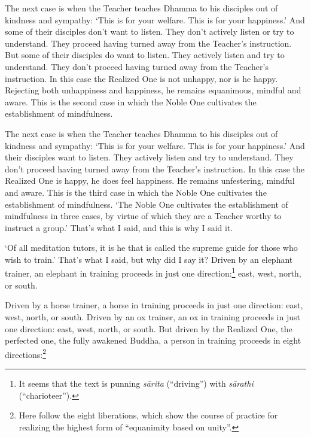 \documentclass[12pt,openany]{book}%
\begin{document}
The next case is when the Teacher teaches Dhamma to his disciples out of kindness and sympathy: ‘This is for your welfare. This is for your happiness.’ And some of their disciples don’t want to listen. They don’t actively listen or try to understand. They proceed having turned away from the Teacher’s instruction. But some of their disciples do want to listen. They actively listen and try to understand. They don’t proceed having turned away from the Teacher’s instruction. In this case the Realized One is not unhappy, nor is he happy. Rejecting both unhappiness and happiness, he remains equanimous, mindful and aware. This is the second case in which the Noble One cultivates the establishment of mindfulness. 

The next case is when the Teacher teaches Dhamma to his disciples out of kindness and sympathy: ‘This is for your welfare. This is for your happiness.’ And their disciples want to listen. They actively listen and try to understand. They don’t proceed having turned away from the Teacher’s instruction. In this case the Realized One is happy, he does feel happiness. He remains unfestering, mindful and aware. This is the third case in which the Noble One cultivates the establishment of mindfulness. ‘The Noble One cultivates the establishment of mindfulness in three cases, by virtue of which they are a Teacher worthy to instruct a group.’ That’s what I said, and this is why I said it. 

‘Of all meditation tutors, it is he that is called the supreme guide for those who wish to train.’ That’s what I said, but why did I say it? Driven by an elephant trainer, an elephant in training proceeds in just one direction:\footnote{It seems that the text is punning \textit{\textsanskrit{sārita}} (“driving”) with \textit{\textsanskrit{sārathi}} (“charioteer”). } east, west, north, or south. 

Driven by a horse trainer, a horse in training proceeds in just one direction: east, west, north, or south. Driven by an ox trainer, an ox in training proceeds in just one direction: east, west, north, or south. But driven by the Realized One, the perfected one, the fully awakened Buddha, a person in training proceeds in eight directions:\footnote{Here follow the eight liberations, which show the course of practice for realizing the highest form of “equanimity based on unity”. } 
\end{document}
